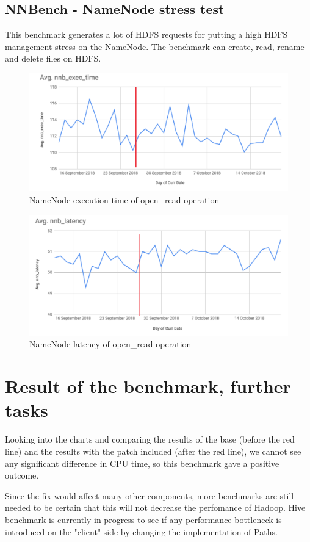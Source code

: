 \subsection{NNBench - NameNode stress test}
This benchmark generates a lot of HDFS requests for putting a high HDFS management stress on the NameNode. The benchmark can create, read, rename and delete files on HDFS.

\begin{figure}[H]
	\includegraphics[width=125mm, keepaspectratio]{figures/nn_exec.png}
	\centering
	\caption{NameNode execution time of open\_read operation}
\end{figure}
\begin{figure}[H]
	\includegraphics[width=125mm, keepaspectratio]{figures/nn_latency.png}
	\centering
	\caption{NameNode latency of open\_read operation}
\end{figure}

\section{Result of the benchmark, further tasks}
Looking into the charts and comparing the results of the base (before the red line) and the results with the patch included (after the red line), we cannot see any significant difference in CPU time, so this benchmark gave a positive outcome. 

Since the fix would affect many other components, more benchmarks are still needed to be certain that this will not decrease the perfomance of Hadoop. Hive benchmark is currently in progress to see if any performance bottleneck is introduced on the "client" side by changing the implementation of Paths.

